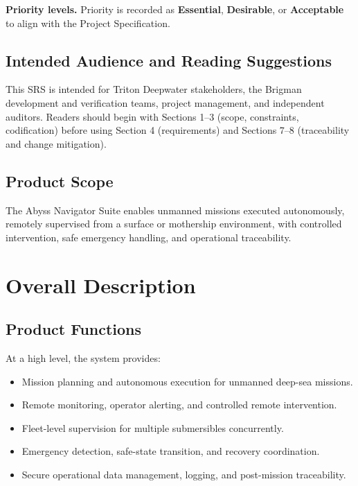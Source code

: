 \documentclass[11pt,a4paper]{article}
\begin{document}
\textbf{Priority levels.} Priority is recorded as \textbf{Essential}, \textbf{Desirable}, or \textbf{Acceptable} to align with the Project Specification.

\subsection{Intended Audience and Reading Suggestions}
This SRS is intended for Triton Deepwater stakeholders, the Brigman development and verification teams, project management, and independent auditors. Readers should begin with Sections 1--3 (scope, constraints, codification) before using Section 4 (requirements) and Sections 7--8 (traceability and change mitigation).

\subsection{Product Scope}
The Abyss Navigator Suite enables unmanned missions executed autonomously, remotely supervised from a surface or mothership environment, with controlled intervention, safe emergency handling, and operational traceability.

\section{Overall Description}

\subsection{Product Functions}
At a high level, the system provides:
\begin{itemize}[leftmargin=*,nosep]
  \item Mission planning and autonomous execution for unmanned deep-sea missions.
  \item Remote monitoring, operator alerting, and controlled remote intervention.
  \item Fleet-level supervision for multiple submersibles concurrently.
  \item Emergency detection, safe-state transition, and recovery coordination.
  \item Secure operational data management, logging, and post-mission traceability.
\end{itemize}
\end{document}

